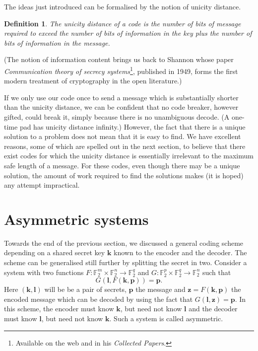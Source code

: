 \documentclass[12pt,a4paper]{article}
\theoremstyle{plain}
\newtheorem{definition}[theorem]{Definition}
\theoremstyle{definition}
\begin{document}
The ideas just introduced can be formalised
by the notion of unicity distance.
\begin{definition}\label{unicity}
The \emph{unicity distance}
of a code is the number of bits of message
required to exceed the number of bits of
information in the key plus the number
of bits of information in the message.
\end{definition}

(The notion of information content
brings us back to Shannon whose paper
\emph{Communication theory of secrecy systems}\footnote{Available
on the web and in his \emph{Collected Papers}.},
published in 1949, forms the first modern treatment
of cryptography in the open literature.) 

If we only use our code once to send a message
which is substantially shorter than the unicity
distance, we can be confident that no code breaker,
however gifted, could break it, simply because
there is no unambiguous decode.
(A one-time pad has unicity distance infinity.)
However, the fact that there is a unique solution
to a problem does not mean that it is easy
to find.
We have excellent reasons, some of which
are spelled out in the next section, to believe that
there exist codes for which the unicity distance
is essentially irrelevant to the maximum safe length
of a message. For these codes, even though there may
be a unique solution, the amount of work required
to find the solutions makes (it is hoped) any
attempt impractical.
\section{Asymmetric systems}\label{S;symmetric} Towards the end
of the previous section, we discussed a general
coding scheme depending on a shared secret
key ${\mathbf k}$ known to the encoder
and the decoder. The scheme can be generalised
still further by splitting the secret in two.
Consider a system
with two functions
$F:{\mathbb F}_{2}^{m}\times{\mathbb F}_{2}^{n}
\rightarrow{\mathbb F}_{2}^{q}$ and
$G:{\mathbb F}_{2}^{p}\times{\mathbb F}_{2}^{q}
\rightarrow{\mathbb F}_{2}^{n}$
such that
\[G({\mathbf l},F({\mathbf k},{\mathbf p}))={\mathbf p}.\]
Here $({\mathbf k},{\mathbf l})$ will be
be a pair of secrets, ${\mathbf p}$ the message and
${\mathbf z}=F({\mathbf k},{\mathbf p})$ the
encoded message which can be decoded by
using the fact that $G({\mathbf l},{\mathbf z})
={\mathbf p}$. In this scheme, the encoder
must know ${\mathbf k}$, but need not know ${\mathbf l}$
and the decoder must know ${\mathbf l}$,
but need not know ${\mathbf k}$. Such a system
is called asymmetric.
\end{document}
